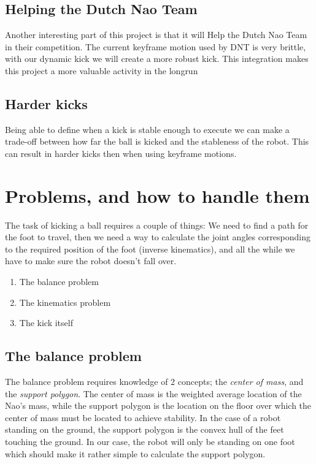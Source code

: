 \documentclass[a4paper]{article}
\begin{document}
\subsection{Helping the Dutch Nao Team}
Another interesting part of this project
is that it will Help the Dutch Nao Team in their competition. The
current keyframe motion used by DNT is very brittle, with our dynamic kick we will create a
more robust kick. 
This integration makes this project a more valuable activity in the longrun

\subsection{Harder kicks}
Being able to define when a kick is stable enough to execute we can make a
trade-off between how far the ball is kicked and the stableness of the
robot. This can result in harder kicks then when using keyframe motions.



\section{Problems, and how to handle them}
The task of kicking a ball requires a couple of things: We need to find a path
for the foot to travel, then we need a way to calculate the joint angles
corresponding to the required position of the foot (inverse kinematics), and all
the while we have to make sure the robot doesn’t fall over.

\begin{enumerate}
  \item The balance problem
  \item The kinematics problem
  \item The kick itself
\end{enumerate}

\subsection{The balance problem}
The balance problem requires knowledge of 2 concepts; the \emph{center of mass},
and the \emph{support polygon}. The center of mass is the weighted average
location of the Nao’s mass, while the support polygon is the location on the
floor over which the center of mass must be located to achieve stability. In the
case of a robot standing on the ground, the support polygon is the convex hull
of the feet touching the ground. In our case, the robot will only be standing on
one foot which should make it rather simple to calculate the support polygon. 
\end{document}
